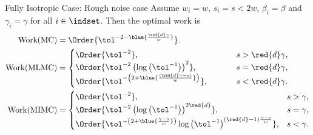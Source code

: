 \begin{frame}{Fully Isotropic Case: Rough noise case}
  Assume  $w_i = w$, $s_i = s < 2w$, $\beta_i = \beta$ and $\gamma_i =
  \gamma$ for all $i \in \indset$. Then the optimal work is
  \begin{align*}
    \text{Work}({\text{MC}})  &= \Order{\tol^{-2 - \blue{\frac{\red{d}\gamma}{w}}}}. \\
    \text{Work}({\text{MLMC}}) &= \begin{cases}
  \Order{\tol^{-2}}, & s > \red{d}\gamma, \\
  \Order{\tol^{-2} \left(\log\left(\tol^{-1}\right)\right)^2}, \hskip 4em & s = \red{d}\gamma, \\
  \Order{\tol^{-\left(2 +\blue{\frac{(\red{d}\gamma-s)}{w}}\right)}},  & s < \red{d}\gamma. \\
\end{cases} \\
    \text{Work}({\text{MIMC}}) &= \begin{cases}
  \Order{\tol^{-2}}, & s > \gamma, \\
  \Order{\tol^{-2} \left(\log\left(\tol^{-1}\right)\right)^{2\red{d}}}, & s = \gamma, \\
  \Order{\tol^{-\left(2 + \blue{\frac{\gamma-s}{w}}\right) } \log\left(\tol^{-1}\right)^{(\red{d}-1)\frac{\gamma-s}{w}}},  & s < \gamma.
  \end{cases}
\end{align*}
\end{frame}



